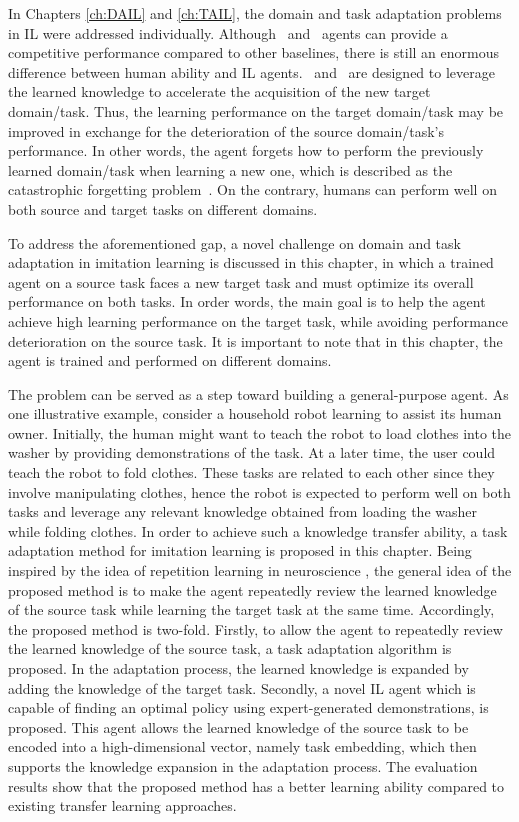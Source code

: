In Chapters \ref{ch:DAIL} and \ref{ch:TAIL}, the domain and task adaptation problems in IL were addressed individually.
Although \DAIL\ and \TAIL\ agents can provide a competitive performance compared to other baselines, there is still an enormous difference between human ability and IL agents.
\DAIL\ and \TAIL\ are designed to leverage the learned knowledge to accelerate the acquisition of the new target domain/task.
Thus,
the learning performance on the target domain/task may be improved in exchange for the deterioration of the source domain/task's performance.
In other words,
the agent forgets how to perform the previously learned domain/task when learning a new one,
which is described as the catastrophic forgetting problem~\cite{TL_Forgetting_1, TL_Forgetting_2}.
On the contrary,
humans can perform well on both source and target tasks on different domains.

To address the aforementioned gap, a novel challenge on domain and task adaptation in imitation learning is discussed in this chapter,
in which a trained agent on a source task faces a new target task and must optimize its overall performance on both tasks.
In order words,
the main goal is to
help the agent achieve high learning performance on the target task,
while avoiding performance deterioration on the source task.
It is important to note that in this chapter,
the agent is trained and performed on different domains.

The problem can be served as a step toward building a general-purpose agent.
As one illustrative example, consider a household robot learning to assist its human owner.
Initially,
the human might want to teach the robot to load clothes into the washer by providing demonstrations of the task.
At a later time,
the user could teach the robot to fold clothes.
These tasks are related to each other since they involve manipulating clothes,
hence the robot is expected to perform well on both tasks and leverage any relevant knowledge obtained from loading the washer while folding clothes.
In order to achieve such a knowledge transfer ability,
a task adaptation method for imitation learning is proposed in this chapter.
Being inspired by the idea of repetition learning in neuroscience \cite{Memory_Effect_1, Memory_Repetition_1, Memory_Repetition_2},
the general idea of the proposed method is to make the agent repeatedly review the learned knowledge of the source task while learning the target task at the same time.
Accordingly,
the proposed method is two-fold.
Firstly,
to allow the agent to repeatedly review the learned knowledge of the source task,
a task adaptation algorithm is proposed.
In the adaptation process,
the learned knowledge is expanded by adding the knowledge of the target task.
Secondly,
a novel IL agent which is capable of finding an optimal policy using expert-generated demonstrations,
is proposed.
This agent allows the learned knowledge of the source task to be encoded into a high-dimensional vector,
namely task embedding,
which then supports the knowledge expansion in the adaptation process.
The evaluation results show that the proposed method has a better learning ability compared to existing transfer learning
approaches.
